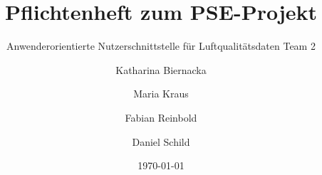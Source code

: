 \title{Pflichtenheft zum PSE-Projekt}
\subtitle{Anwenderorientierte Nutzerschnittstelle für Luftqualitätsdaten Team 2}
\date{\today}
\author{Katharina Biernacka \and Maria Kraus \and Fabian Reinbold \and Daniel Schild}
\newcommand{\softwarename}{VisAQ }
\newcommand{\longSoftwarename}{Visualizing Air Quality}
